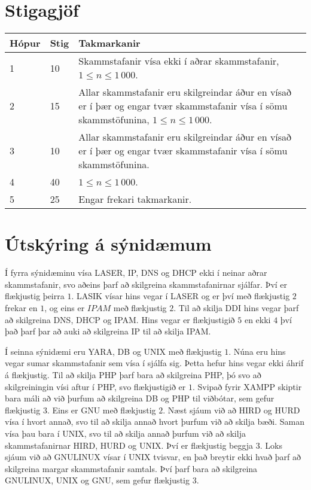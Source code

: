\section*{Stigagjöf}
\begin{tabular}{|l|l|l|}
\hline
Hópur & Stig & Takmarkanir \\ \hline
1     & 10   & Skammstafanir vísa ekki í aðrar skammstafanir, $1 \leq n \leq 1 \, 000$. \\ \hline
2     & 15   & Allar skammstafanir eru skilgreindar áður en vísað er í þær og engar tvær skammstafanir vísa í sömu skammstöfunina, $1 \leq n \leq 1 \, 000$. \\ \hline
3     & 10   & Allar skammstafanir eru skilgreindar áður en vísað er í þær og engar tvær skammstafanir vísa í sömu skammstöfunina. \\ \hline
4     & 40   & $1 \leq n \leq 1\, 000$.  \\ \hline
5     & 25   & Engar frekari takmarkanir.  \\ \hline
\end{tabular}

\section*{Útskýring á sýnidæmum}

Í fyrra sýnidæminu vísa LASER, IP, DNS og DHCP ekki í neinar aðrar skammstafanir, svo aðeins þarf að skilgreina skammstafanirnar sjálfar. 
Því er flækjustig þeirra $1$. 
LASIK vísar hins vegar í LASER og er því með flækjustig $2$ frekar en $1$, og eins er $IPAM$ með flækjustig $2$.
Til að skilja DDI hins vegar þarf að skilgreina DNS, DHCP og IPAM. 
Hins vegar er flækjustigið $5$ en ekki $4$ því það þarf þar að auki að skilgreina IP til að skilja IPAM.

Í seinna sýnidæmi eru YARA, DB og UNIX með flækjustig $1$. 
Núna eru hins vegar sumar skammstafanir sem vísa í sjálfa sig.
Þetta hefur hins vegar ekki áhrif á flækjustig. 
Til að skilja PHP þarf bara að skilgreina PHP, þó svo að skilgreiningin vísi aftur í PHP, svo flækjustigið er $1$.
Svipað fyrir XAMPP skiptir bara máli að við þurfum að skilgreina DB og PHP til viðbótar, sem gefur flækjustig $3$.
Eins er GNU með flækjustig $2$.
Næst sjáum við að HIRD og HURD vísa í hvort annað, svo til að skilja annað hvort þurfum við að skilja bæði.
Saman vísa þau bara í UNIX, svo til að skilja annað þurfum við að skilja skammstafanirnar HIRD, HURD og UNIX.
Því er flækjustig beggja $3$.
Loks sjáum við að GNULINUX vísar í UNIX tvisvar, en það breytir ekki hvað þarf að skilgreina margar skammstafanir samtals.
Því þarf bara að skilgreina GNULINUX, UNIX og GNU, sem gefur flækjustig $3$.
